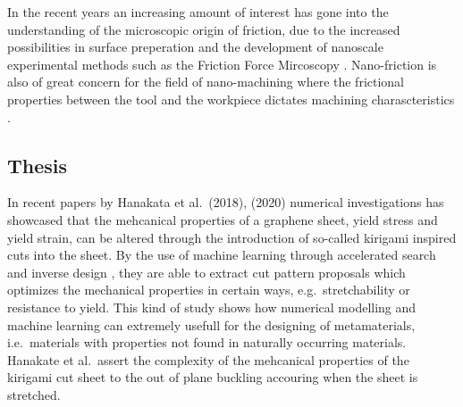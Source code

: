 In the recent years an increasing amount of interest has gone into the understanding of the microscopic origin of friction, due to the increased possibilities in surface preperation and the development of nanoscale experimental methods such as the Friction Force Mircoscopy \cite{FK2D}. Nano-friction is also of great concern for the field of nano-machining where the frictional properties between the tool and the workpiece dictates machining charascteristics \cite{kim_nano-scale_2009}.




\subsection{Thesis}
In recent papers by Hanakata et al.\ \cite{PhysRevLett.121.255304}(2018),
\cite{PhysRevResearch.2.042006}(2020) numerical investigations has showcased
that the mehcanical properties of a graphene sheet, yield stress and yield
strain, can be altered through the introduction of so-called kirigami inspired
cuts into the sheet. By the use of machine learning through accelerated search
\cite{PhysRevLett.121.255304} and inverse design
\cite{PhysRevResearch.2.042006}, they are able to extract cut pattern proposals
which optimizes the mechanical properties in certain ways, e.g.\ stretchability
or resistance to yield. This kind of study shows how numerical modelling and
machine learning can extremely usefull for the designing of metamaterials, i.e.\
materials with properties not found in naturally occurring materials. Hanakate
et al.\ assert the complexity of the mehcanical properties of the kirigami cut
sheet to the out of plane buckling accouring when the sheet is stretched. 

